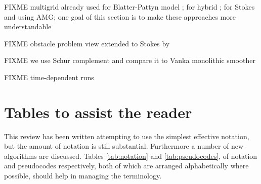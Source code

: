 \documentclass[letterpaper,final,12pt,reqno]{amsart}
\theoremstyle{claim}
\numberwithin{equation}{section}
\numberwithin{figure}{section}
\numberwithin{table}{section}
\numberwithin{theorem}{section}
\begin{document}
FIXME multigrid already used for Blatter-Pattyn model \cite{BrownSmithAhmadia2013}; for hybrid \cite{Jouvetetal2013,JouvetGraeser2013}; for Stokes \cite{IsaacStadlerGhattas2015} and \cite{Tuminaroetal2016} using AMG; one goal of this section is to make these approaches more understandable

FIXME obstacle problem view extended to Stokes by \cite{WirbelJarosch2020}

FIXME we use Schur complement \cite{Bueler2021,Elmanetal2014} and compare it to Vanka monolithic smoother \cite{Farrelletal2019}

FIXME time-dependent runs


\small

\bigskip



\normalsize

\appendix

\section{Tables to assist the reader}

This review has been written attempting to use the simplest effective notation, but the amount of notation is still substantial.  Furthermore a number of new algorithms are discussed.  Tables \ref{tab:notation} and \ref{tab:pseudocodes}, of notation and pseudocodes respectively, both of which are arranged alphabetically where possible, should help in managing the terminology.
\end{document}
